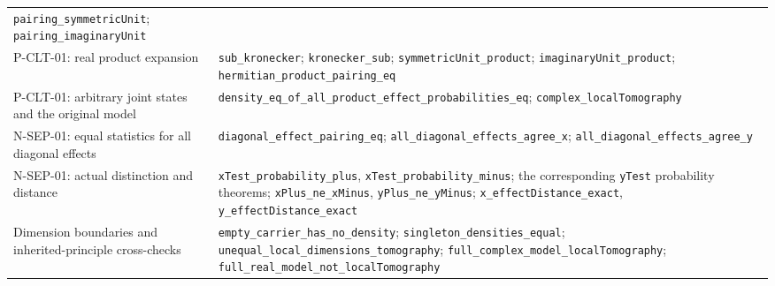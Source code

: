 \documentclass[
  11pt,
  oneside]{book}
\begin{document}
\begin{longtable}[]{@{}
  >{\raggedright\arraybackslash}p{}
  >{\raggedright\arraybackslash}p{}@{}}
\texttt{pairing\_\allowbreak symmetric\allowbreak Unit}; \texttt{pairing\_\allowbreak imaginary\allowbreak Unit} \\
P-CLT-01: real product expansion & \texttt{sub\_\allowbreak kronecker};
\texttt{kronecker\_\allowbreak sub}; \texttt{symmetric\allowbreak Unit\_\allowbreak product};
\texttt{imaginary\allowbreak Unit\_\allowbreak product};
\texttt{hermitian\_\allowbreak product\_\allowbreak pairing\_\allowbreak eq} \\
P-CLT-01: arbitrary joint states and the original model &
\texttt{density\_\allowbreak eq\_\allowbreak of\_\allowbreak all\_\allowbreak product\_\allowbreak effect\_\allowbreak probabilities\_\allowbreak eq};
\texttt{complex\_\allowbreak local\allowbreak Tomography} \\
N-SEP-01: equal statistics for all diagonal effects &
\texttt{diagonal\_\allowbreak effect\_\allowbreak pairing\_\allowbreak eq};
\texttt{all\_\allowbreak diagonal\_\allowbreak effects\_\allowbreak agree\_\allowbreak x};
\texttt{all\_\allowbreak diagonal\_\allowbreak effects\_\allowbreak agree\_\allowbreak y} \\
N-SEP-01: actual distinction and distance &
\texttt{x\allowbreak Test\_\allowbreak probability\_\allowbreak plus}, \texttt{x\allowbreak Test\_\allowbreak probability\_\allowbreak minus};
the corresponding \texttt{y\allowbreak Test} probability theorems;
\texttt{x\allowbreak Plus\_\allowbreak ne\_\allowbreak x\allowbreak Minus}, \texttt{y\allowbreak Plus\_\allowbreak ne\_\allowbreak y\allowbreak Minus};
\texttt{x\_\allowbreak effect\allowbreak Distance\_\allowbreak exact}, \texttt{y\_\allowbreak effect\allowbreak Distance\_\allowbreak exact} \\
Dimension boundaries and inherited-principle cross-checks &
\texttt{empty\_\allowbreak carrier\_\allowbreak has\_\allowbreak no\_\allowbreak density};
\texttt{singleton\_\allowbreak densities\_\allowbreak equal};
\texttt{unequal\_\allowbreak local\_\allowbreak dimensions\_\allowbreak tomography};
\texttt{full\_\allowbreak complex\_\allowbreak model\_\allowbreak local\allowbreak Tomography};
\texttt{full\_\allowbreak real\_\allowbreak model\_\allowbreak not\_\allowbreak local\allowbreak Tomography} \\
\end{longtable}
\end{document}
